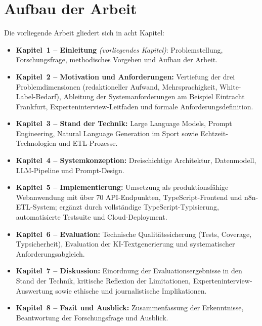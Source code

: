 \section{Aufbau der Arbeit}\label{aufbau-der-arbeit}

Die vorliegende Arbeit gliedert sich in acht Kapitel:

\begin{itemize}
\tightlist
\item
  \textbf{Kapitel~1 -- Einleitung} \emph{(vorliegendes Kapitel)}:
  Problemstellung, Forschungsfrage, methodisches Vorgehen und Aufbau der
  Arbeit.
\item
  \textbf{Kapitel~2 -- Motivation und Anforderungen:} Vertiefung der
  drei Problemdimensionen (redaktioneller Aufwand, Mehrsprachigkeit,
  White-Label-Bedarf), Ableitung der Systemanforderungen am Beispiel
  Eintracht Frankfurt, Experteninterview-Leitfaden und formale
  Anforderungsdefinition.
\item
  \textbf{Kapitel~3 -- Stand der Technik:} Large Language Models, Prompt
  Engineering, Natural Language Generation im Sport sowie
  Echtzeit-Technologien und ETL-Prozesse.
\item
  \textbf{Kapitel~4 -- Systemkonzeption:} Dreischichtige Architektur,
  Datenmodell, LLM-Pipeline und Prompt-Design.
\item
  \textbf{Kapitel~5 -- Implementierung:} Umsetzung als produktionsfähige
  Webanwendung mit über 70 API-Endpunkten, TypeScript-Frontend und
  n8n-ETL-System; ergänzt durch vollständige TypeScript-Typisierung,
  automatisierte Testsuite und Cloud-Deployment.
\item
  \textbf{Kapitel~6 -- Evaluation:} Technische Qualitätssicherung
  (Tests, Coverage, Typsicherheit), Evaluation der KI-Textgenerierung
  und systematischer Anforderungsabgleich.
\item
  \textbf{Kapitel~7 -- Diskussion:} Einordnung der Evaluationsergebnisse in den Stand der Technik, kritische Reflexion der Limitationen, Experteninterview-Auswertung sowie ethische und journalistische Implikationen.
\item
  \textbf{Kapitel~8 -- Fazit und Ausblick:} Zusammenfassung der
  Erkenntnisse, Beantwortung der Forschungsfrage und Ausblick.
\end{itemize}
